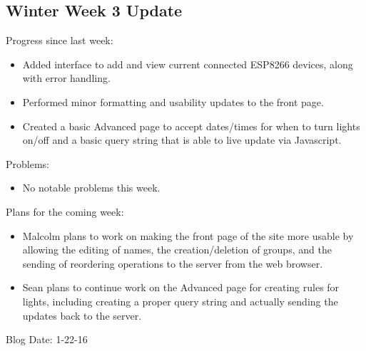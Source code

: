 \subsection{Winter Week 3 Update}
Progress since last week:
\begin{itemize}
   \item Added interface to add and view current connected ESP8266 devices, along with error handling.
   \item Performed minor formatting and usability updates to the front page.
   \item Created a basic Advanced page to accept dates/times for when to turn lights on/off and a basic query string that is able to live update via Javascript.
\end{itemize}
Problems:
\begin{itemize}
   \item No notable problems this week.
\end{itemize}
Plans for the coming week:
\begin{itemize}
   \item Malcolm plans to work on making the front page of the site more usable by allowing the editing of names, the creation/deletion of groups, and the sending of reordering operations to the server from the web browser.
   \item Sean plans to continue work on the Advanced page for creating rules for lights, including creating a proper query string and actually sending the updates back to the server.
\end{itemize}
Blog Date: 1-22-16

